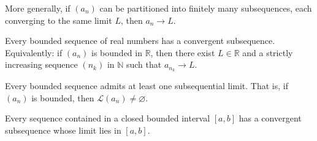\begin{remark}
More generally, if $(a_n)$ can be partitioned into finitely many subsequences,
each converging to the same limit $L$, then $a_n \to L$.
\end{remark}


\begin{theorem}
Every bounded sequence of real numbers has a convergent subsequence.
Equivalently: if $(a_n)$ is bounded in $\mathbb{R}$, then there exist
$L \in \mathbb{R}$ and a strictly increasing sequence $(n_k)$ in $\mathbb{N}$
such that $a_{n_k} \to L$.
\end{theorem}



\begin{corollary}
Every bounded sequence admits at least one subsequential limit.
That is, if $(a_n)$ is bounded, then $\mathcal{L}(a_n) \neq \varnothing$.
\end{corollary}

\begin{corollary}
Every sequence contained in a closed bounded interval
$[a, b]$ has a convergent subsequence whose limit lies in $[a, b]$.
\end{corollary}




